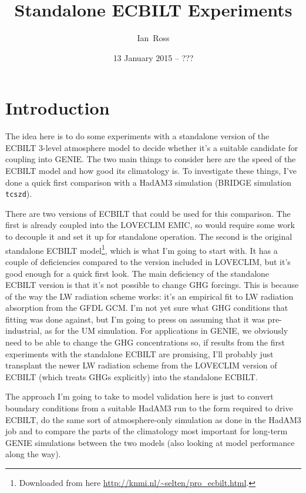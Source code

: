 \documentclass[a4paper,11pt,article]{article}
\title{Standalone ECBILT Experiments}
\author{Ian~Ross}
\date{13 January 2015 -- ???}
\begin{document}
\maketitle

\section{Introduction}

The idea here is to do some experiments with a standalone version of
the ECBILT 3-level atmosphere model to decide whether it's a suitable
candidate for coupling into GENIE.  The two main things to consider
here are the speed of the ECBILT model and how good its climatology
is.  To investigate these things, I've done a quick first comparison
with a HadAM3 simulation (BRIDGE simulation \texttt{tcszd}).

There are two versions of ECBILT that could be used for this
comparison.  The first is already coupled into the LOVECLIM EMIC, so
would require some work to decouple it and set it up for standalone
operation.  The second is the original standalone ECBILT
model\footnote{Downloaded from here
  \url{http://knmi.nl/~selten/pro_ecbilt.html}.}, which is what I'm
going to start with.  It has a couple of deficiencies compared to the
version included in LOVECLIM, but it's good enough for a quick first
look.  The main deficiency of the standalone ECBILT version is that
it's not possible to change GHG forcings.  This is because of the way
the LW radiation scheme works: it's an empirical fit to LW radiation
absorption from the GFDL GCM.  I'm not yet sure what GHG conditions
that fitting was done against, but I'm going to press on assuming that
it was pre-industrial, as for the UM simulation.  For applications in
GENIE, we obviously need to be able to change the GHG concentrations
so, if results from the first experiments with the standalone ECBILT
are promising, I'll probably just transplant the newer LW radiation
scheme from the LOVECLIM version of ECBILT (which treats GHGs
explicitly) into the standalone ECBILT.

The approach I'm going to take to model validation here is just to
convert boundary conditions from a suitable HadAM3 run to the form
required to drive ECBILT, do the same sort of atmosphere-only
simulation as done in the HadAM3 job and to compare the parts of the
climatology most important for long-term GENIE simulations between the
two models (also looking at model performance along the way).
\end{document}
